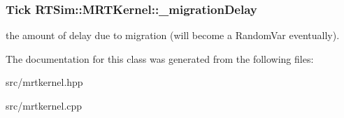 \subsubsection[{\texorpdfstring{\+\_\+migration\+Delay}{_migrationDelay}}]{\setlength{\rightskip}{0pt plus 5cm}Tick R\+T\+Sim\+::\+M\+R\+T\+Kernel\+::\+\_\+migration\+Delay\hspace{0.3cm}{\ttfamily [protected]}}\hypertarget{classRTSim_1_1MRTKernel_ab54d11942b5876bbc20a860d4ab8e5f3}{}\label{classRTSim_1_1MRTKernel_ab54d11942b5876bbc20a860d4ab8e5f3}
the amount of delay due to migration (will become a Random\+Var eventually). 

The documentation for this class was generated from the following files\+:\begin{DoxyCompactItemize}
\item 
src/mrtkernel.\+hpp\item 
src/mrtkernel.\+cpp\end{DoxyCompactItemize}
